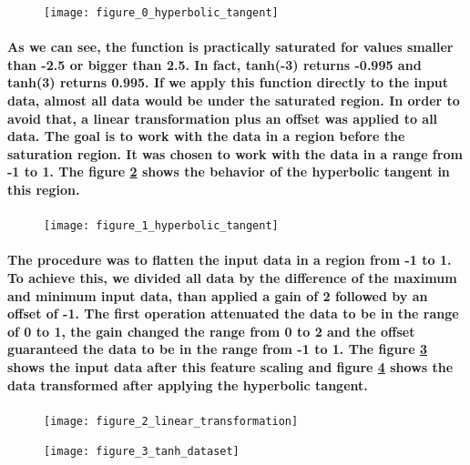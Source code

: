 \documentclass[a4paper]{article}
\begin{document}
\begin{figure}[H]
    \centering
    \texttt{[image: figure\_0\_hyperbolic\_tangent]}
    \caption{}
    \label{fig:pre-ex2-0}
\end{figure}

\paragraph{As we can see, the function is practically saturated for values smaller than -2.5 or bigger than 2.5. In fact, tanh(-3) returns -0.995 and tanh(3) returns 0.995. If we apply this function directly to the input data, almost all data would be under the saturated region. In order to avoid that, a linear transformation plus an offset was applied to all data. The goal is to work with the data in a region before the saturation region. It was chosen to work with the data in a range from -1 to 1. The figure \ref{fig:pre-ex2-1} shows the behavior of the hyperbolic tangent in this region.}

\begin{figure}[H]
    \centering
    \texttt{[image: figure\_1\_hyperbolic\_tangent]}
    \caption{}
    \label{fig:pre-ex2-1}
\end{figure}

\paragraph{The procedure was to flatten the input data in a region from -1 to 1. To achieve this, we divided all data by the difference of the maximum and minimum input data, than applied a gain of 2 followed by an offset of -1. The first operation attenuated the data to be in the range of 0 to 1, the gain changed the range from 0 to 2 and the offset guaranteed the data to be in the range from -1 to 1. The figure \ref{fig:pre-ex2-2} shows the input data after this feature scaling and figure \ref{fig:pre-ex2-3} shows the data transformed after applying the hyperbolic tangent.}

\begin{figure}[H]
    \centering
    \texttt{[image: figure\_2\_linear\_transformation]}
    \caption{}
    \label{fig:pre-ex2-2}
\end{figure}

\begin{figure}[H]
    \centering
    \texttt{[image: figure\_3\_tanh\_dataset]}
    \caption{}
    \label{fig:pre-ex2-3}
\end{figure}
\end{document}
